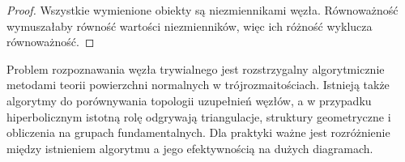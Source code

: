 \begin{proof}
Wszystkie wymienione obiekty są niezmiennikami węzła.
Równoważność wymuszałaby równość wartości niezmienników,
więc ich różność wyklucza równoważność.
\end{proof}

\begin{uwaga}
Problem rozpoznawania węzła trywialnego jest rozstrzygalny
algorytmicznie metodami teorii powierzchni normalnych
w trójrozmaitościach. Istnieją także algorytmy do porównywania
topologii uzupełnień węzłów, a w przypadku hiperbolicznym
istotną rolę odgrywają triangulacje, struktury geometryczne
i obliczenia na grupach fundamentalnych.
Dla praktyki ważne jest rozróżnienie między istnieniem
algorytmu a jego efektywnością na dużych diagramach.
\end{uwaga}



